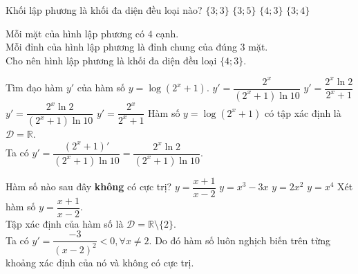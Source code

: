 \begin{ex}%
 Khối lập phương là khối đa diện đều loại nào?
 \choice
  {$\{3;3\}$}
  {$\{3;5\}$}
  {\True $\{4;3\}$}
  {$\{3;4\}$}
 \loigiai
  {
  \immini
  {
  Mỗi mặt của hình lập phương có $4$ cạnh.\\
  Mỗi đỉnh của hình lập phương là đỉnh chung của đúng $3$ mặt.\\
  Cho nên hình lập phương là khối đa diện đều loại $\{4;3\}$.
  }
  {
  }
  }
\end{ex}

\begin{ex}%
 Tìm đạo hàm $y'$ của hàm số $y = \log (2^x + 1)$.
 \choice
  {$y' = \dfrac{2^x}{(2^x + 1)\ln 10}$}
  {$y' = \dfrac{2^x \ln 2}{2^x + 1}$}
  {\True $y' = \dfrac{2^x \ln 2}{(2^x + 1)\ln 10}$}
  {$y' = \dfrac{2^x}{2^x + 1}$}
 \loigiai
  {
  Hàm số $y = \log (2^x + 1)$ có tập xác định là $\mathscr{D}=\mathbb{R}$.\\
  Ta có $y' = \dfrac{(2^x + 1)'}{(2^x + 1) \ln 10} = \dfrac{2^x \ln 2}{(2^x + 1) \ln 10}$.
  }
\end{ex}

\begin{ex}%
 Hàm số nào sau đây \textbf{không} có cực trị?
 \choice
  {\True $y = \dfrac{x+1}{x-2}$}
  {$y = x^3 - 3x$}
  {$y = 2x^2$}
  {$y = x^4$}
 \loigiai
  {
  Xét hàm số $y = \dfrac{x+1}{x-2}$.\\
  Tập xác định của hàm số là $\mathscr{D} = \mathbb{R} \setminus \{2\}$.\\
  Ta có $y' = \dfrac{-3}{(x-2)^2} < 0,  \forall x \neq 2$.
  Do đó hàm số luôn nghịch biến trên từng khoảng xác định của nó và không có cực trị.
  }
\end{ex}

